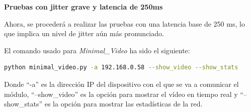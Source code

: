 \newpage

\textbf{Pruebas con jitter grave y latencia de 250ms}
\vspace{\baselineskip}

Ahora, se procederá a realizar las pruebas con una latencia base de 250 ms, lo que implica un nivel de jitter aún más pronunciado.
\vspace{\baselineskip}

El comando usado para \textit{Minimal\_Video} ha sido el siguiente:

\begin{lstlisting}[language=bash]
python minimal_video.py -a 192.168.0.58 --show_video --show_stats
\end{lstlisting}
Donde ``-a'' es la dirección IP del dispositivo con el que se va a comunicar el módulo, ``--show\_video'' es la opción para mostrar el vídeo en tiempo real y ``--show\_stats'' es la opción para mostrar las estadísticas de la red.
\vspace{\baselineskip}

